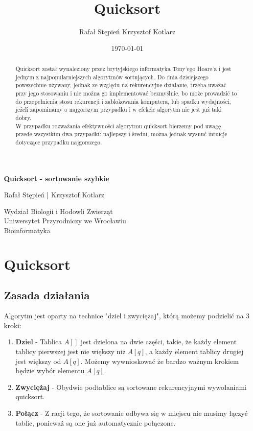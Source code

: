 \documentclass[a4paper,11pt]{report}
\title{Quicksort}
\author{Rafał Stępień Krzysztof Kotlarz}
\date{\today}
\begin{document}
\renewcommand{\tabcolsep}{10mm}

\begin{titlepage}
   \begin{center}
       \vspace*{9cm}
 
       \textbf{\huge{Quicksort - sortowanie szybkie}}
 
       \vspace{1.5cm}
 
       Rafał Stępień | Krzysztof Kotlarz \\
       \vspace{2cm}

 
       Wydział Biologii i Hodowli Zwierząt\\
       Uniwersytet Przyrodniczy we Wrocławiu\\
       Bioinformatyka\\
 
   \end{center}
\end{titlepage}
\newpage
\tableofcontents
\begin{abstract}
Quicksort został wynaleziony przez brytyjskiego informatyka Tony'ego Hoare'a i jest jednym z najpopularniejszych algorytmów sortujących. Do dnia dzisiejszego powszechnie używany, jednak ze względu na rekurencyjne działanie, trzeba uważać przy jego stosowaniu i nie można go implementować bezmyślnie, bo może prowadzić to do przepełnienia stosu rekurencji i zablokowania komputera, lub spadku wydajności, jeżeli zapominamy o najgorszym przypadku i w efekcie algorytm nie jest już taki dobry.\\
W przypadku rozważania efektywności algorytmu quicksort bierzemy pod uwagę przede wszystkim dwa przypadki: najlepszy i średni, można jednak wysnuć intuicje dotyczące przypadku najgorszego.
\end{abstract}

\chapter{Quicksort}
\section{Zasada działania}
Algorytm jest oparty na technice "dziel i zwyciężaj", którą możemy podzielić na 3 kroki:
\begin{enumerate}
\item \textbf{Dziel} - Tablica $A[]$ jest dzielona na dwie części, takie, że każdy element tablicy pierwszej jest nie większy niż $A[q]$, a każdy element tablicy drugiej jest większy od $A[q]$. Możemy wywnioskować że bardzo ważnym krokiem będzie wybór elementu $A[q]$.
\item \textbf{Zwyciężaj} - Obydwie podtablice są sortowane rekurencyjnymi wywołaniami quicksort.
\item \textbf{Połącz} - Z racji tego, że sortowanie odbywa się w miejscu nie musimy łączyć tablic, ponieważ są one już automatycznie połączone.
\end{enumerate}
\end{document}
